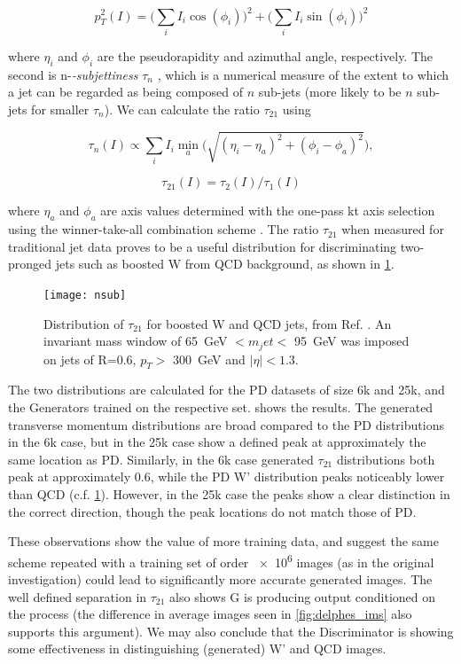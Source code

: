 \documentclass{report}
\newcommand{\gev}{\giga\electronvolt}
\begin{document}
$$
p_T^2(I) = \bigg(\sum_i I_i \cos(\phi_i)\bigg)^2 + \bigg(\sum_i I_i \sin(\phi_i)\bigg)^2
$$

where $\eta_i$ and $\phi_i$ are the pseudorapidity and azimuthal angle, respectively. The second is n-\textit{-subjettiness} $\tau_{n}$ \cite{nsubjettiness}, which is a numerical measure of the extent to which a jet can be regarded as being composed of $n$ sub-jets (more likely to be $n$ sub-jets for smaller $\tau_n$). We can calculate the ratio $\tau_{21}$ using

$$
\tau_n (I) \propto \sum_i I_i \min_a \bigg(\sqrt{(\eta_i - \eta_a)^2 + (\phi_i - \phi_a)^2}\bigg),
$$

$$
\tau_{21} (I) = \tau_2 (I) / \tau_1 (I)
$$

where $\eta_a$ and $\phi_a$ are axis values determined with the one-pass kt axis selection using the winner-take-all combination scheme \cite{axis}. The ratio $\tau_{21}$ when measured for traditional jet data proves to be a useful distribution for discriminating two-pronged jets such as boosted W from QCD background, as shown in \cref{fig:nsub}.

\begin{figure}[H]
	\centering
	\texttt{[image: nsub]}
	
	\caption{Distribution of $\tau_{21}$ for boosted W and QCD jets, from Ref. \cite{nsubjettiness}. An invariant mass window of \SI{65}{\gev} $< m_jet <$ \SI{95}{\gev} was imposed on jets of R=0.6, $p_T >$ \SI{300}{\gev} and $|\eta| < 1.3$.}
	\label{fig:nsub}
	
\end{figure}

The two distributions are calculated for the PD datasets of size 6k and 25k, and the Generators trained on the respective set.  shows the results. The generated transverse momentum distributions are broad compared to the PD distributions in the 6k case, but in the 25k case show a defined peak at approximately the same location as PD. Similarly, in the 6k case generated $\tau_{21}$ distributions both peak at approximately 0.6, while the PD W' distribution peaks noticeably lower than QCD (c.f. \cref{fig:nsub}). However, in the 25k case the peaks show a clear distinction in the correct direction, though the peak locations do not match those of PD. 

These observations show the value of more training data, and suggest the same scheme repeated with a training set of order \num{e6} images (as in the original investigation) could lead to significantly more accurate generated images. The well defined separation in $\tau_{21}$ also shows G is producing output conditioned on the process (the difference in average images seen in \cref{fig:delphes_ims} also supports this argument). We may also conclude that the Discriminator is showing some effectiveness in distinguishing (generated) W' and QCD images. 
\end{document}
